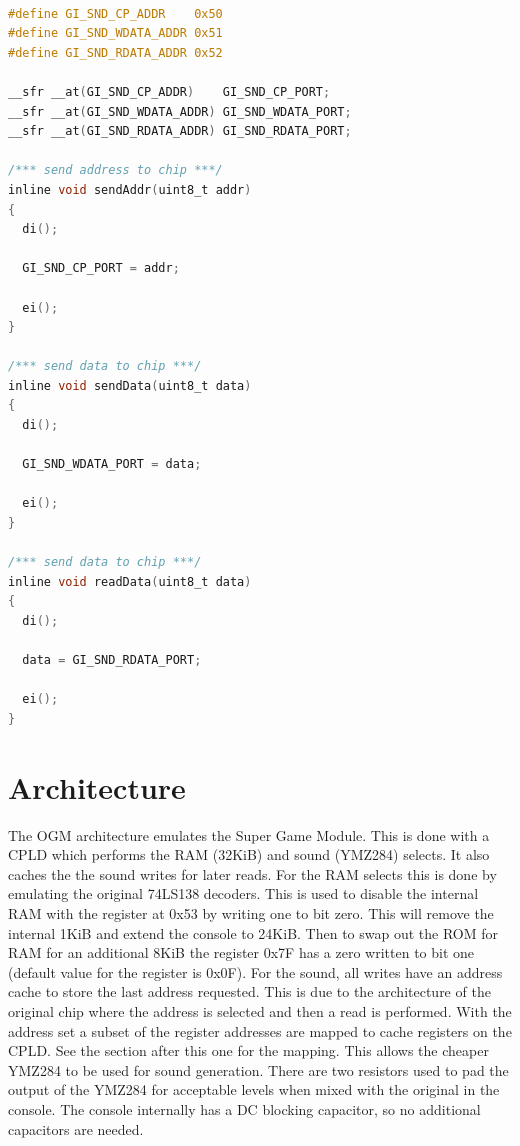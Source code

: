 \begin{lstlisting}[language=C]

#define GI_SND_CP_ADDR    0x50
#define GI_SND_WDATA_ADDR 0x51
#define GI_SND_RDATA_ADDR 0x52

__sfr __at(GI_SND_CP_ADDR)    GI_SND_CP_PORT;
__sfr __at(GI_SND_WDATA_ADDR) GI_SND_WDATA_PORT;
__sfr __at(GI_SND_RDATA_ADDR) GI_SND_RDATA_PORT;

/*** send address to chip ***/
inline void sendAddr(uint8_t addr)
{
  di();

  GI_SND_CP_PORT = addr;

  ei();
}

/*** send data to chip ***/
inline void sendData(uint8_t data)
{
  di();

  GI_SND_WDATA_PORT = data;

  ei();
}

/*** send data to chip ***/
inline void readData(uint8_t data)
{
  di();

  data = GI_SND_RDATA_PORT;

  ei();
}
\end{lstlisting}

\section{Architecture}

\par
The OGM architecture emulates the Super Game Module. This is done with a CPLD which performs the RAM (32KiB) and sound (YMZ284) selects. It also caches the the sound writes for later reads. For the RAM selects this is done by emulating the original 74LS138 decoders. This is used to disable the internal RAM with the register at 0x53 by writing one to bit zero. This will remove the internal 1KiB and extend the console to 24KiB. Then to swap out the ROM for RAM for an additional 8KiB the register 0x7F has a zero written to bit one (default value for the register is 0x0F). For the sound, all writes have an address cache to store the last address requested. This is due to the architecture of the original chip where the address is selected and then a read is performed. With the address set a subset of the register addresses are mapped to cache registers on the CPLD. See the section after this one for the mapping. This allows the cheaper YMZ284 to be used for sound generation. There are two resistors used to pad the output of the YMZ284 for acceptable levels when mixed with the original in the console. The console internally has a DC blocking capacitor, so no additional capacitors are needed.

